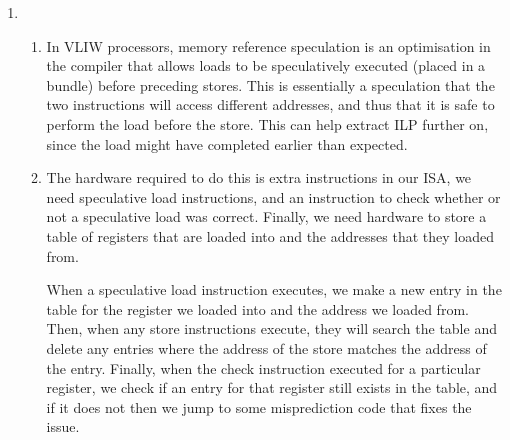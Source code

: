 \begin{enumerate}[label=(\alph*)]
  \item
    \begin{enumerate}[label=(\roman*)]

      \item
        In VLIW processors, memory reference speculation is an optimisation in the compiler that allows loads to be speculatively executed (placed in a bundle) before preceding stores. This is essentially a speculation that the two instructions will access different addresses, and thus that it is safe to perform the load before the store. This can help extract ILP further on, since the load might have completed earlier than expected.

      \item
        The hardware required to do this is extra instructions in our ISA, we need speculative load instructions, and an instruction to check whether or not a speculative load was correct. Finally, we need hardware to store a table of registers that are loaded into and the addresses that they loaded from.

        When a speculative load instruction executes, we make a new entry in the table for the register we loaded into and the address we loaded from. Then, when any store instructions execute, they will search the table and delete any entries where the address of the store matches the address of the entry. Finally, when the check instruction executed for a particular register, we check if an entry for that register still exists in the table, and if it does not then we jump to some misprediction code that fixes the issue.

        
    \end{enumerate}
    
\end{enumerate}


